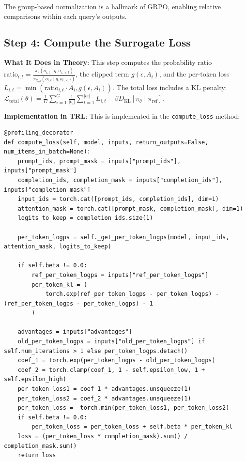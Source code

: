 \documentclass{article}
\begin{document}
The group-based normalization is a hallmark of GRPO, enabling relative comparisons within each query’s outputs.

\subsection*{Step 4: Compute the Surrogate Loss}

\textbf{What It Does in Theory}: This step computes the probability ratio \( \text{ratio}_{i,t} = \frac{\pi_\theta(o_{i,t} \mid q, o_{i,<t})}{\pi_{\theta_{\text{old}}}(o_{i,t} \mid q, o_{i,<t})} \), the clipped term \( g(\epsilon, A_i) \), and the per-token loss \( L_{i,t} = \min(\text{ratio}_{i,t} \cdot A_i, g(\epsilon, A_i)) \). The total loss includes a KL penalty: \( \mathcal{L}_{\text{total}}(\theta) = \frac{1}{G} \sum_{i=1}^{G} \frac{1}{|o_i|} \sum_{t=1}^{|o_i|} L_{i,t} - \beta D_{\text{KL}}[\pi_\theta \,||\, \pi_{\text{ref}}] \).

\vspace{2mm}

\noindent \textbf{Implementation in TRL}: This is implemented in the \texttt{compute\_loss} method:

\begin{verbatim}
@profiling_decorator
def compute_loss(self, model, inputs, return_outputs=False, num_items_in_batch=None):
    prompt_ids, prompt_mask = inputs["prompt_ids"], inputs["prompt_mask"]
    completion_ids, completion_mask = inputs["completion_ids"], inputs["completion_mask"]
    input_ids = torch.cat([prompt_ids, completion_ids], dim=1)
    attention_mask = torch.cat([prompt_mask, completion_mask], dim=1)
    logits_to_keep = completion_ids.size(1)

    per_token_logps = self._get_per_token_logps(model, input_ids, attention_mask, logits_to_keep)

    if self.beta != 0.0:
        ref_per_token_logps = inputs["ref_per_token_logps"]
        per_token_kl = (
            torch.exp(ref_per_token_logps - per_token_logps) - (ref_per_token_logps - per_token_logps) - 1
        )

    advantages = inputs["advantages"]
    old_per_token_logps = inputs["old_per_token_logps"] if self.num_iterations > 1 else per_token_logps.detach()
    coef_1 = torch.exp(per_token_logps - old_per_token_logps)
    coef_2 = torch.clamp(coef_1, 1 - self.epsilon_low, 1 + self.epsilon_high)
    per_token_loss1 = coef_1 * advantages.unsqueeze(1)
    per_token_loss2 = coef_2 * advantages.unsqueeze(1)
    per_token_loss = -torch.min(per_token_loss1, per_token_loss2)
    if self.beta != 0.0:
        per_token_loss = per_token_loss + self.beta * per_token_kl
    loss = (per_token_loss * completion_mask).sum() / completion_mask.sum()
    return loss
\end{verbatim}
\end{document}
